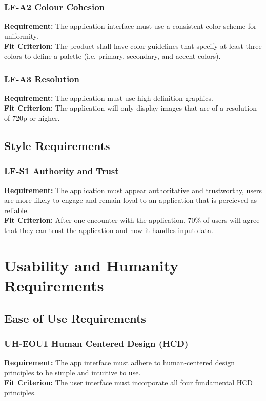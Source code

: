 \documentclass[12pt]{article}
\begin{document}
\subsubsection*{LF-A2 Colour Cohesion} \label{LF-A2}
\textbf{Requirement:} The application interface must use a consistent color scheme for uniformity.\\
\textbf{Fit Criterion:} The product shall have color guidelines that specify at least three colors to define a palette 
(i.e. primary, secondary, and accent colors).
\subsubsection*{LF-A3 Resolution} \label{LF-A3}
\textbf{Requirement:} The application must use high definition graphics.\\
\textbf{Fit Criterion:} The application will only display images that are of a resolution of 720p or higher.
\subsection{Style Requirements}
\subsubsection*{LF-S1 Authority and Trust} \label{LF-S1}
\textbf{Requirement:} The application must appear authoritative and trustworthy, users are more likely to engage
and remain loyal to an application that is percieved as reliable.\\
\textbf{Fit Criterion:} After one encounter with the application, 70\% of users will agree 
that they can trust the application and how it handles input data.


\section{Usability and Humanity Requirements}
\subsection{Ease of Use Requirements}
\subsubsection*{UH-EOU1 Human Centered Design (HCD)}  \label{UH-EOU1}
\textbf{Requirement:} The app interface must adhere to human-centered design principles to be simple and intuitive to use.\\
\textbf{Fit Criterion:} The user interface must incorporate all four fundamental HCD principles.
\end{document}
